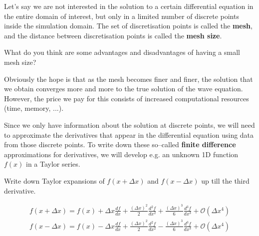 \pagebreak


Let's say we are not interested in the solution to a certain differential equation in the entire domain of interest, but only in a limited number of discrete points inside the simulation domain. The set of discretisation points is called the \textbf{mesh}, and the distance between discretisation points is called the \textbf{mesh size}.

\begin{cue}
What do you think are some advantages and disadvantages of having a small mesh size?  
\end{cue}

Obviously the hope is that as the mesh becomes finer and finer, the solution that we obtain converges more and more to the true solution of the wave equation. However, the price we pay for this consists of increased computational resources (time, memory, ...).

Since we only have information about the solution at discrete points, we will need to approximate the derivatives that appear in the differential equation using data from those discrete points. To write down these so--called \textbf{finite difference} approximations for derivatives, we will develop e.g. an unknown 1D function $f(x)$ in a Taylor series.

\begin{cue}
\noindent{}Write down Taylor expansions of $f(x+\Delta x)$ and $f(x-\Delta x)$ up till the third derivative. 
\end{cue}

\begin{gather}
f(x+\Delta x) = f(x) + \Delta x \frac{d f}{d x} + \frac{{(\Delta x)}^2}{2} \frac{d^2 f}{d x^2} + \frac{{(\Delta x)}^3}{6} \frac{d^3 f}{d x^3} + \mathcal{O}\left(\Delta x^4\right) \label{eq-taylor-plus} \\
f(x-\Delta x) = f(x) - \Delta x \frac{d f}{d x} + \frac{{(\Delta x)}^2}{2} \frac{d^2 f}{d x^2} - \frac{{(\Delta x)}^3}{6} \frac{d^3 f}{d x^3} + \mathcal{O}\left(\Delta x^4\right) \label{eq-taylor-min}
\end{gather} 

